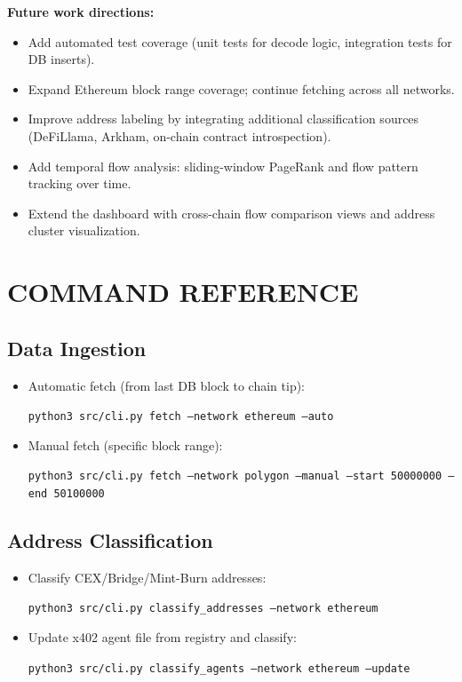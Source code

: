 \documentclass[a4paper,12pt]{report}
\begin{document}
\textbf{Future work directions:}
\begin{itemize}
\item Add automated test coverage (unit tests for decode logic, integration tests for DB inserts).
\item Expand Ethereum block range coverage; continue fetching across all networks.
\item Improve address labeling by integrating additional classification sources (DeFiLlama,
Arkham, on-chain contract introspection).
\item Add temporal flow analysis: sliding-window PageRank and flow pattern tracking over time.
\item Extend the dashboard with cross-chain flow comparison views and address cluster visualization.
\end{itemize}




\appendix
\chapter{COMMAND REFERENCE}

\section*{Data Ingestion}
\begin{itemize}
\item Automatic fetch (from last DB block to chain tip):
\begin{flushleft}
    \texttt{python3 src/cli.py fetch --network ethereum --auto}
\end{flushleft}
\item Manual fetch (specific block range):
\begin{flushleft}
    \texttt{python3 src/cli.py fetch --network polygon --manual --start 50000000 --end 50100000}
\end{flushleft}
\end{itemize}

\section*{Address Classification}
\begin{itemize}
\item Classify CEX/Bridge/Mint-Burn addresses:
\begin{flushleft}
    \texttt{python3 src/cli.py classify\_addresses --network ethereum}
\end{flushleft}
\item Update x402 agent file from registry and classify:
\begin{flushleft}
    \texttt{python3 src/cli.py classify\_agents --network ethereum --update}
\end{flushleft}
\end{itemize}
\end{document}
